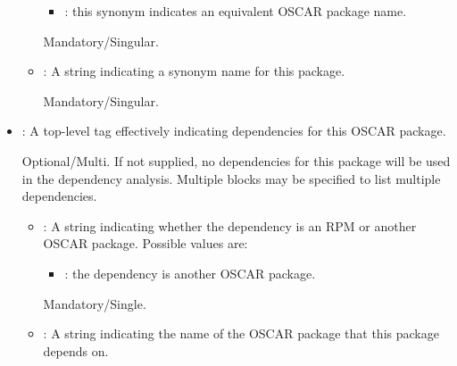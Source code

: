 \begin{itemize}
\begin{itemize}
    \begin{itemize}
    \item {}: this synonym indicates an equivalent OSCAR
      package name.
    \end{itemize}

    Mandatory/Singular.
  \item {}: A string indicating a synonym name for this
    package.

    Mandatory/Singular.
  \end{itemize}

\item {}: A top-level tag effectively indicating
  dependencies for this OSCAR package.  
  
  Optional/Multi.  If not supplied, no dependencies for this package
  will be used in the dependency analysis.  Multiple 
  blocks may be specified to list multiple dependencies.

  \begin{itemize}
  \item {}: A string indicating whether the dependency is
    an RPM or another OSCAR package.  Possible values are:

    \begin{itemize}
    \item {}: the dependency is another OSCAR package.
    \end{itemize}

    Mandatory/Single.
    

    
    
  \item {}: A string indicating the name of the OSCAR
    package that this package depends on.


\end{itemize}
\end{itemize}
